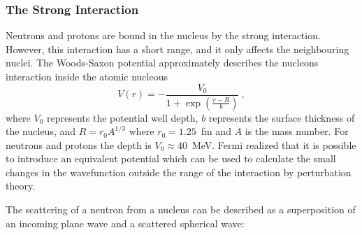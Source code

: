
\subsubsection{The Strong Interaction}
Neutrons and protons are bound in the nucleus by the strong
interaction. However, this interaction has a short range, and it only
affects the neighbouring nuclei. The Woods-Saxon potential
approximately describes the nucleons interaction inside the atomic
nucleous
\begin{equation}
  \label{eqn:woodsax}
  V(r) = - \frac{V_0}{1+\exp(\frac{r-R}{b})}~,
\end{equation}
where $V_0$ represents the potential well depth, $b$ represents the
surface thickness of the nucleus, and $R = r_0 A^{1/3}$ where
$r_0 = 1.25$~fm and $A$ is the mass number. For neutrons and protons
the depth is $V_0 \approx 40$~MeV.
Fermi realized that it is possible to introduce an equivalent
potential which can be used to calculate the small changes in the
wavefunction outside the range of the interaction by perturbation
theory.


The scattering of a neutron from a nucleus can be described as a
superposition of an incoming plane wave and a scattered spherical
wave:

